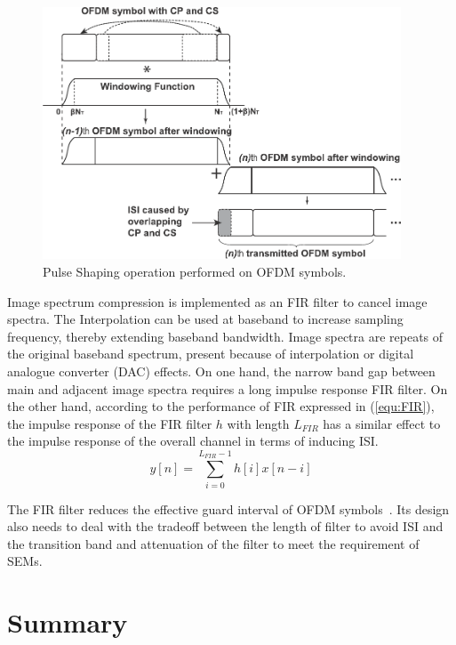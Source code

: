 \begin{figure}[t]
    \centerline{\includegraphics [width=0.9\columnwidth, height=7.5cm] {./Figures/w-ofdm.pdf} }
	\vspace{-2mm}
    \caption{Pulse Shaping operation performed on OFDM symbols.}
    \label{fig:PS}
\end{figure}

Image spectrum compression is implemented as an FIR filter to cancel image spectra.
The Interpolation can be used at baseband to increase sampling frequency, thereby extending baseband bandwidth.
Image spectra are repeats of the original baseband spectrum, present because of interpolation or digital analogue converter (DAC) effects.
On one hand, the narrow band gap between main and adjacent image spectra requires a long impulse response FIR filter.
On the other hand, according to the performance of FIR expressed in (\ref{equ:FIR}), the impulse response of the FIR filter $h$ with length $L_{FIR}$ has a similar effect to the impulse response of the overall channel in terms of inducing ISI.
\begin{equation}
\label{equ:FIR}
y[n] =  \sum_{i=0}^{L_{FIR}-1} h[i]x[n-i] 
\end{equation}

The FIR filter reduces the effective guard interval of OFDM symbols~\cite{farhang2008signal}.
Its design also needs to deal with the tradeoff between the length of filter to avoid ISI and the transition band and attenuation of the filter to meet the requirement of SEMs.

\section{Summary}


